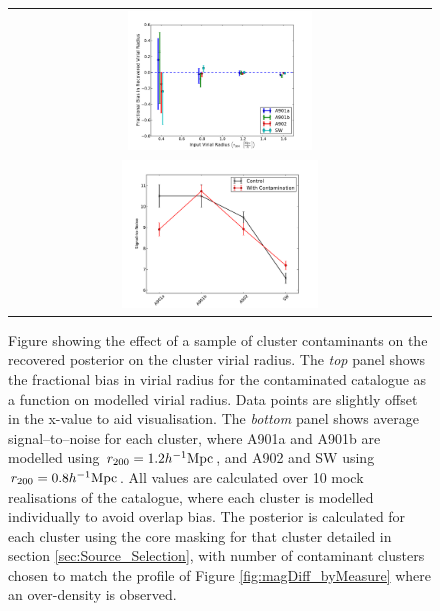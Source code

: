 \documentclass[useAMS,usenatbib,times,letter,amssymb]{mn2e}
\begin{document}
\begin{figure}%
\centering
  \begin{tabular}{@{}c@{}}
    \includegraphics[width=0.45\textwidth]{Figures/Mock_Application/ClusterContamination_SizeMag_Bias_MagCutOnly.pdf} \\
    \includegraphics[width=0.48\textwidth]{Figures/Mock_Application/ClusterContamination_SizeMag_Signal-To-Noise_MagCutOnly.pdf} 
  \end{tabular}
  \caption[Fractional bias on recovered cluster virial radius due to a sample of unremoved cluster contaminants]{Figure showing the effect of a sample of cluster contaminants on the recovered posterior on the cluster virial radius. The {\it top} panel shows the fractional bias in virial radius for the contaminated catalogue as a function on modelled virial radius. Data points are slightly offset in the x-value to aid visualisation. The {\it bottom} panel shows average signal--to--noise for each cluster, where A901a and A901b are modelled using $r_{200} = 1.2 h^{-1}{\rm Mpc}$, and A902 and SW using $r_{200} = 0.8 h^{-1}{\rm Mpc}$. All values are calculated over 10 mock realisations of the catalogue, where each cluster is modelled individually to avoid overlap bias. The posterior is calculated for each cluster using the core masking for that cluster detailed in section \ref{sec:Source_Selection}, with number of contaminant clusters chosen to match the profile of Figure \ref{fig:magDiff_byMeasure} where an over-density is observed.}\label{fig:ClusterContamination_Mocks_SizeMag}
\end{figure}
\end{document}
